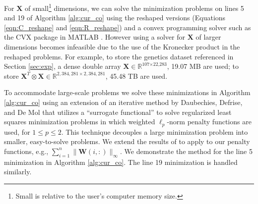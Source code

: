 \documentclass[12pt]{article}
\begin{document}
For $\mathbf{X}$ of small\footnote{Small is relative to the user's computer memory size.} dimensions, we can solve the minimization problems on lines 5 and 19 of Algorithm \ref{alg:cur_co} using the reshaped versions (Equations \ref{eqn:C_reshape} and \ref{eqn:R_reshape}) and a convex programming solver such as the CVX package in MATLAB \cite{cvx_web, cvx_book}. However using a solver for $\mathbf{X}$ of larger dimensions becomes infeasible due to the use of the Kronecker product in the reshaped problems. For example, to store the genetics dataset referenced in Section \ref{sec:exp}, a dense double array $\mathbf{X} \in \mathbb{R}^{\text{107} \times \text{22,283}}$, 19.07 MB are used; to store $\mathbf{X}^T \otimes \mathbf{X} \in \mathbb{R}^{2,384,281 \times 2,384,281}$, 45.48 TB are used.  

To accommodate large-scale problems we solve these minimizations in Algorithm \ref{alg:cur_co} using an extension of an iterative method by Daubechies, Defrise, and De Mol \cite{daubechies_etal_2004} that utilizes a ``surrogate functional'' to solve regularized least squares minimization problems in which weighted $\ell_p$-norm penalty functions are used, for $1 \leq p \leq 2$. This technique decouples a large minimization problem into smaller, easy-to-solve problems.  We extend the results of \cite{daubechies_etal_2004} to apply to our penalty functions, e.g., $\sum_{i=1}^n \| \mathbf{W}(i,:) \|_{\infty}$.  We demonstrate the method for the line 5 minimization in Algorithm \ref{alg:cur_co}.  The line 19 minimization is handled similarly.
\end{document}
